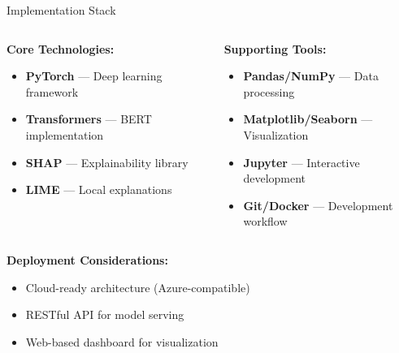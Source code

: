 \begin{frame}{Implementation Stack}
\begin{columns}
\begin{column}{0.5\textwidth}
\textbf{Core Technologies:}
\begin{itemize}
    \item \textbf{PyTorch} --- Deep learning framework
    \item \textbf{Transformers} --- BERT implementation
    \item \textbf{SHAP} --- Explainability library
    \item \textbf{LIME} --- Local explanations
\end{itemize}
\end{column}
\begin{column}{0.5\textwidth}
\textbf{Supporting Tools:}
\begin{itemize}
    \item \textbf{Pandas/NumPy} --- Data processing
    \item \textbf{Matplotlib/Seaborn} --- Visualization
    \item \textbf{Jupyter} --- Interactive development
    \item \textbf{Git/Docker} --- Development workflow
\end{itemize}
\end{column}
\end{columns}

\vspace{0.5cm}
\textbf{Deployment Considerations:}
\begin{itemize}
    \item Cloud-ready architecture (Azure-compatible)
    \item RESTful API for model serving
    \item Web-based dashboard for visualization
\end{itemize}
\end{frame}
